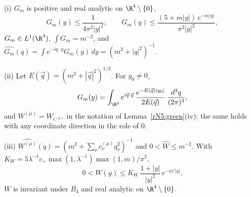 \begin{lemma}\label{rN5:cont}
\textup{(i)} $G_m$ is positive and real analytic on $\R^4\setminus\{0\}$,
\[
G_m(y)\le\frac1{4\pi^2|y|^2},\qquad G_m(y)\le\frac{(5+m|y|)\,e^{-m|y|}}
{\pi^2|y|^2},
\]
$G_m\in L^1(\R^4)$, $\int G_m=m^{-2}$, and $\widehat{G_m}(q)=\int e^{-iq\cdot
y}G_m(y)\,dy=(m^2+|q|^2)^{-1}$.

\textup{(ii)} Let $E(\vec q)=(m^2+|\vec q|^2)^{1/2}$. For $y_0\ne0$,
\[
G_m(y)=\int_{\R^3}e^{i\vec q\cdot\vec y}\,\frac{e^{-E(\vec q)|y_0|}}
{2E(\vec q)}\,\frac{d^3q}{(2\pi)^3},
\]
and $W^{(\mu)}=W_{c^{(\mu)}}$ in the notation of
Lemma~\textup{\ref{rN5:green}(iv)}; the same holds with any coordinate
direction in the role of $0$.

\textup{(iii)} $\widehat{W^{(\mu)}}(q)=(m^2+\sum_\nu c^{(\mu)}_\nu
q_\nu^2)^{-1}$ and $0<\widehat W\le m^{-2}$. With $K_W=5\lambda^{-1}c_+
\max(1,\lambda^{-1})\max(1,m)/\pi^2$,
\[
0<W(y)\le K_W\,\frac{1+|y|}{|y|^2}\,e^{-m'|y|} .
\]
$W$ is invariant under $B_4$ and real analytic on $\R^4\setminus\{0\}$.
\end{lemma}

